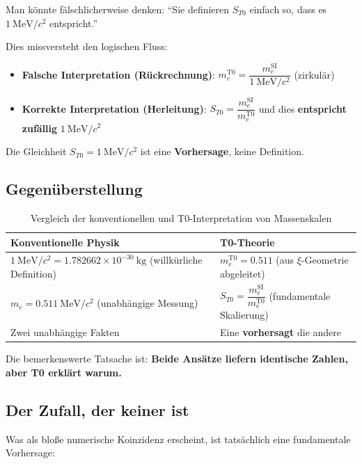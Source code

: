 	Man könnte fälschlicherweise denken: ``Sie definieren $S_{T0}$ einfach so, dass es $1~\mathrm{MeV}/c^2$ entspricht.''
	
	Dies missversteht den logischen Fluss:
	
	\begin{itemize}
		\item \textbf{Falsche Interpretation (Rückrechnung)}: 
		$m_e^{\mathrm{T0}} = \dfrac{m_e^{\mathrm{SI}}}{1~\mathrm{MeV}/c^2}$ (zirkulär)
		
		\item \textbf{Korrekte Interpretation (Herleitung)}: 
		$S_{T0} = \dfrac{m_e^{\mathrm{SI}}}{m_e^{\mathrm{T0}}}$ und dies \textbf{entspricht zufällig} $1~\mathrm{MeV}/c^2$
	\end{itemize}
	
	Die Gleichheit $S_{T0} = 1~\mathrm{MeV}/c^2$ ist eine \textbf{Vorhersage}, keine Definition.
	
	\subsection{Gegenüberstellung}
	
	\begin{table}[h]
		\centering
		\begin{tabular}{p{6cm}p{6cm}}
			\toprule
			\textbf{Konventionelle Physik} & \textbf{T0-Theorie} \\
			\midrule
			$1~\mathrm{MeV}/c^2 = 1.782662\times 10^{-30}~\mathrm{kg}$ (willkürliche Definition) & $m_e^{\mathrm{T0}} = 0.511$ (aus $\xi$-Geometrie abgeleitet) \\
			$m_e = 0.511~\mathrm{MeV}/c^2$ (unabhängige Messung) & $S_{T0} = \dfrac{m_e^{\mathrm{SI}}}{m_e^{\mathrm{T0}}}$ (fundamentale Skalierung) \\
			Zwei unabhängige Fakten & Eine \textbf{vorhersagt} die andere \\
			\bottomrule
		\end{tabular}
		\caption{Vergleich der konventionellen und T0-Interpretation von Massenskalen}
	\end{table}
	
	Die bemerkenswerte Tatsache ist: \textbf{Beide Ansätze liefern identische Zahlen, aber T0 erklärt warum.}
	
	\subsection{Der Zufall, der keiner ist}
	
	Was als bloße numerische Koinzidenz erscheint, ist tatsächlich eine fundamentale Vorhersage:
	
